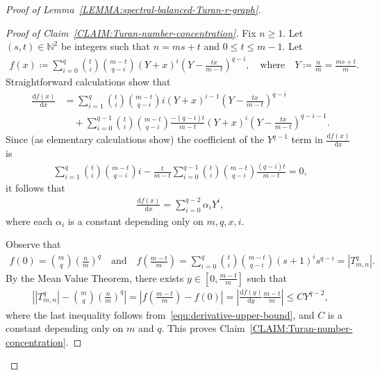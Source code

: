 \documentclass[11pt,a4paper]{article}
\begin{document}
\begin{proof}[Proof of Lemma~\ref{LEMMA:spectral-balanced-Turan-r-graph}]
\begin{proof}[Proof of Claim~\ref{CLAIM:Turan-number-concentration}]
        Fix $n \ge 1$. Let $(s,t) \in \mathbb{N}^2$ be integers such that $n = ms + t$ and $0 \le t \le m-1$. 
        Let 
        \begin{align*}
            f(x)
            \coloneqq \sum_{i=0}^{q} \binom{t}{i}\binom{m-t}{q-i} \left(Y + x\right)^{i} \left(Y - \frac{t x}{m-t} \right)^{q-i}, 
            \quad\text{where}\quad 
            Y \coloneqq \frac{n}{m} = \frac{ms+t}{m}. 
        \end{align*}
        Straightforward calculations show that
        \begin{align*}
            \frac{\mathrm{d} f(x)}{\mathrm{d} x}
            & = \sum_{i=1}^{q} \binom{t}{i}\binom{m-t}{q-i} i \left(Y + x\right)^{i-1} \left(Y -\frac{t x}{m-t} \right)^{q-i} \\
            & \quad + \sum_{i=0}^{q-1} \binom{t}{i}\binom{m-t}{q-i} \frac{-(q-i)t}{m-t} \left(Y + x\right)^{i} \left(Y -\frac{t x}{m-t} \right)^{q-i-1}.
        \end{align*}
        Since (as elementary calculations show) the coefficient of the $Y^{q-1}$ term in $\frac{\mathrm{d} f(x)}{\mathrm{d} x}$ is 
        \begin{align*}
            \sum_{i=1}^{q} \binom{t}{i}\binom{m-t}{q-i} i 
            - \frac{t}{m-t} \sum_{i=0}^{q-1} \binom{t}{i}\binom{m-t}{q-i} \frac{(q-i)t}{m-t}
            = 0,  
        \end{align*}
        it follows that  
        \begin{align}\label{equ:derivative-upper-bound}
            \frac{\mathrm{d} f(x)}{\mathrm{d} x}
            = \sum_{i=0}^{q-2} \alpha_i Y^{i}, 
        \end{align}
        where each $\alpha_i$ is a constant depending only on $m, q, x, i$. 
    
        Observe that
        \begin{align*}
            f(0) = \binom{m}{q}\left(\frac{n}{m}\right)^{q}
            \quad\text{and}\quad 
            f\left(\frac{m-t}{m}\right)
            = \sum_{i=0}^{q} \binom{t}{i}\binom{m-t}{q-i} \left(s+1\right)^{i} s^{q-i}
            = |T_{m,n}^{q}|. 
        \end{align*}
        By the Mean Value Theorem, there exists $y \in \left[0, \frac{m-t}{m}\right]$ such that 
        \begin{align*}
            \left| |T_{m,n}^{q}| - \binom{m}{q}\left(\frac{n}{m}\right)^{q} \right|
             = \left| f\left(\frac{m-t}{m}\right) - f(0) \right| 
             = \left| \frac{\mathrm{d} f(y)}{\mathrm{d} y} \frac{m-t}{m} \right|
            \le C Y^{q-2}, 
        \end{align*}
        where the last inequality follows from~\eqref{equ:derivative-upper-bound}, and $C$ is a constant depending only on $m$ and $q$. 
        This proves Claim~\ref{CLAIM:Turan-number-concentration}. 
    \end{proof}%


\end{proof}
\end{document}
